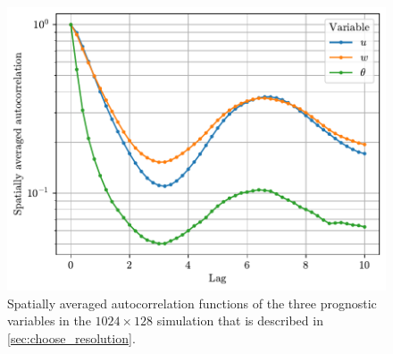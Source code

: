 \documentclass[../main.tex]{subfiles}
\begin{document}
\begin{figure}[ht]
    \centering
    \includegraphics[width=0.6\linewidth]{figures/autocorrelation.pdf}
    \caption{
        Spatially averaged autocorrelation functions of the three prognostic
        variables in the $1024 \times 128$ simulation that is described in
        \cref{sec:choose_resolution}.
    }
    \label{fig:autocorr}
\end{figure}


\ifSubfilesClassLoaded{%
    \emergencystretch=5em
    \printbibliography{}
}{}
\end{document}
